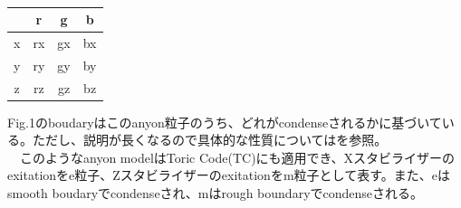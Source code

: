 \documentclass[a4paper,9pt]{ltjsarticle}
\begin{document}
  \begin{table}[h]
    \centering
    \begin{tabular}{c|c|c|c}
       & r & g & b \\
      \hline
      x & rx & gx & bx \\
      \hline
      y & ry & gy & by \\
      \hline
      z & rz & gz & bz \\
      \hline
    \end{tabular}
    \caption{}
  \end{table}

  Fig.1のboudaryはこのanyon粒子のうち、どれがcondenseされるかに基づいている。ただし、説明が長くなるので具体的な性質については\cite{kesselring2024}\cite{kesselring2018}を参照。\\
  　このようなanyon modelはToric Code(TC)にも適用でき、Xスタビライザーのexitationをe粒子、Zスタビライザーのexitationをm粒子として表す。また、eはsmooth boudaryでcondenseされ、mはrough boundaryでcondenseされる。
\clearpage
\end{document}
